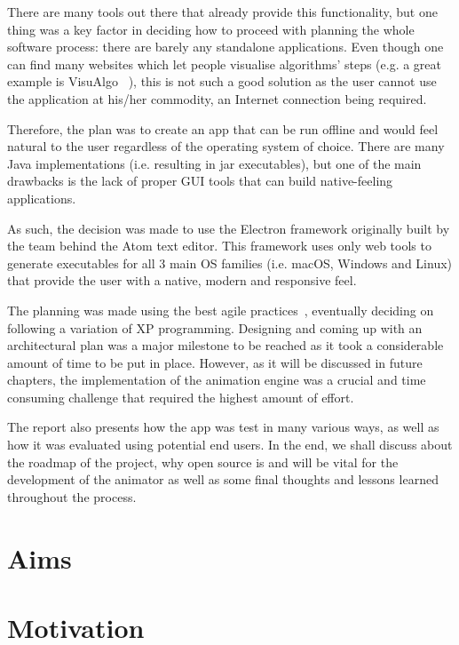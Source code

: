 \documentclass{l4proj}
\begin{document}
There are many tools out there that already provide this functionality, but one thing was a key factor in deciding how to proceed with planning the whole software process: there are barely any standalone applications. Even though one can find many websites which let people visualise algorithms' steps (e.g. a great example is VisuAlgo ~\cite{visualgo}), this is not such a good solution as the user cannot use the application at his/her commodity, an Internet connection being required.

Therefore, the plan was to create an app that can be run offline and would feel natural to the user regardless of the operating system of choice. There are many Java implementations (i.e. resulting in jar executables), but one of the main drawbacks is the lack of proper GUI tools that can build native-feeling applications. 

As such, the decision was made to use the Electron framework originally built by the team behind the Atom text editor. This framework uses only web tools to generate executables for all 3 main OS families (i.e. macOS, Windows and Linux) that provide the user with a native, modern and responsive feel. 

The planning was made using the best agile practices~\cite{agile-methodologies}, eventually deciding on following a variation of XP programming. Designing and coming up with an architectural plan was a major milestone to be reached as it took a considerable amount of time to be put in place. However, as it will be discussed in future chapters, the implementation of the animation engine was a crucial and time consuming challenge that required the highest amount of effort.

The report also presents how the app was test in many various ways, as well as how it was evaluated using potential end users. In the end, we shall discuss about the roadmap of the project, why open source is and will be vital for the development of the animator as well as some final thoughts and lessons learned throughout the process.

\section{Aims}



\section{Motivation}
\end{document}
